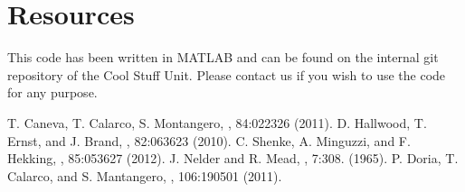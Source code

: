 \documentclass[paper=a4wide, fontsize=12pt]{scrartcl}	 %
\begin{document}
\section*{Resources}
This code has been written in MATLAB and can be found on the internal git repository of the Cool Stuff Unit. Please contact us if you wish to use the code for any purpose.

\begin{thebibliography}{99} %

 T. Caneva, T. Calarco, S. Montangero,
    , 84:022326 (2011).
\vspace*{-10pt}
 D. Hallwood, T. Ernst, and J. Brand,
    , 82:063623 (2010).
\vspace*{-10pt}
 C. Shenke, A. Minguzzi, and F. Hekking,
    , 85:053627 (2012).
\vspace*{-10pt}
 J. Nelder and R. Mead,
    , 7:308. (1965).
\vspace*{-10pt}
 P. Doria, T. Calarco, and S. Mantangero,
    , 106:190501 (2011).
\end{thebibliography}

\end{document}
